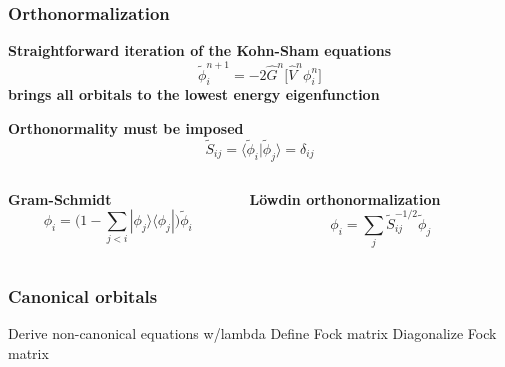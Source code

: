 \documentclass[mathserif, 10pt]{beamer}
\begin{document}
\begin{frame}
    \frametitle{Orthonormalization}
    \centering
    \textbf{Straightforward iteration of the Kohn-Sham equations}
    \begin{equation}
        \nonumber
        \tilde{\phi}_i^{n+1} = -2\hat{G}^n \bigg[\hat{V}^n\phi_i^n\bigg]
    \end{equation}
    \textbf{brings all orbitals to the lowest energy eigenfunction}
    
    \vspace{15mm}

    \textbf{Orthonormality must be imposed}
    \begin{equation}
        \nonumber
        \tilde{S}_{ij} = \langle\tilde{\phi}_i|\tilde{\phi}_j\rangle = \delta_{ij}
    \end{equation}

    \vspace{5mm}

    \begin{columns}
    \begin{column}[b]{0.5\linewidth}
    \centering
    \textbf{Gram-Schmidt}
    \begin{equation}
	\nonumber
	\phi_i = \Big(1 - \sum_{j<i}|\phi_j\rangle\langle\phi_j|\Big)\tilde{\phi}_i
    \end{equation}
    \end{column}

    \begin{column}[b]{0.5\linewidth}
    \centering
    \textbf{L\"{o}wdin orthonormalization}
    \begin{equation}
	\nonumber
	\phi_i = \sum_j \tilde{S}_{ij}^{-1/2}\tilde{\phi}_j
    \end{equation}
    \end{column}
    \end{columns}
\end{frame}

\begin{frame}
    \frametitle{Canonical orbitals}
    Derive non-canonical equations w/lambda
    Define Fock matrix
    Diagonalize Fock matrix
\end{frame}
\end{document}

